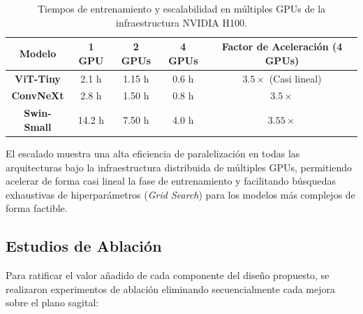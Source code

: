 \begin{table}[htbp]
\centering
\caption{Tiempos de entrenamiento y escalabilidad en múltiples GPUs de la infraestructura NVIDIA H100.}
\label{tab:hardware_performance}
\begin{tabular}{ccccc}
\hline
\textbf{Modelo} & \textbf{1 GPU} & \textbf{2 GPUs} & \textbf{4 GPUs} & \textbf{Factor de Aceleración (4 GPUs)} \\ \hline
\textbf{ViT-Tiny}  & 2.1 h          & 1.15 h          & 0.6 h           & $3.5\times$ (Casi lineal) \\
\textbf{ConvNeXt}  & 2.8 h          & 1.50 h          & 0.8 h           & $3.5\times$ \\
\textbf{Swin-Small}  & 14.2 h         & 7.50 h          & 4.0 h           & $3.55\times$ \\ \hline
\end{tabular}
\end{table}

El escalado muestra una alta eficiencia de paralelización en todas las arquitecturas bajo la infraestructura distribuida de múltiples GPUs, permitiendo acelerar de forma casi lineal la fase de entrenamiento y facilitando búsquedas exhaustivas de hiperparámetros (\textit{Grid Search}) para los modelos más complejos de forma factible.

\subsection{Estudios de Ablación}
\label{subsec:ablacion}
Para ratificar el valor añadido de cada componente del diseño propuesto, se realizaron experimentos de ablación eliminando secuencialmente cada mejora sobre el plano sagital:

